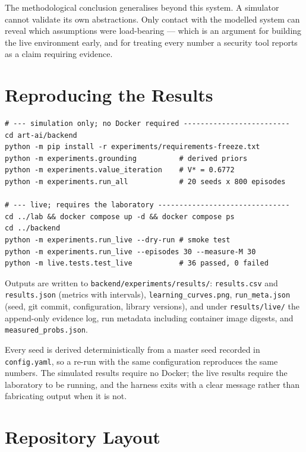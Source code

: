 \documentclass[11pt,a4paper]{report}
\newcommand{\code}[1]{\texttt{\small #1}}
\begin{document}
The methodological conclusion generalises beyond this system. A simulator cannot
validate its own abstractions. Only contact with the modelled system can reveal
which assumptions were load-bearing --- which is an argument for building the
live environment early, and for treating every number a security tool reports as
a claim requiring evidence.

\appendix
\chapter{Reproducing the Results}
\label{app:reproduce}

\begin{lstlisting}[caption={Complete reproduction path.}]
# --- simulation only; no Docker required -------------------------
cd art-ai/backend
python -m pip install -r experiments/requirements-freeze.txt
python -m experiments.grounding          # derived priors
python -m experiments.value_iteration    # V* = 0.6772
python -m experiments.run_all            # 20 seeds x 800 episodes

# --- live; requires the laboratory -------------------------------
cd ../lab && docker compose up -d && docker compose ps
cd ../backend
python -m experiments.run_live --dry-run # smoke test
python -m experiments.run_live --episodes 30 --measure-M 30
python -m live.tests.test_live           # 36 passed, 0 failed
\end{lstlisting}

Outputs are written to \code{backend/experiments/results/}: \code{results.csv}
and \code{results.json} (metrics with intervals), \code{learning\_curves.png},
\code{run\_meta.json} (seed, git commit, configuration, library versions), and
under \code{results/live/} the append-only evidence log, run metadata including
container image digests, and \code{measured\_probs.json}.

Every seed is derived deterministically from a master seed recorded in
\code{config.yaml}, so a re-run with the same configuration reproduces the same
numbers. The simulated results require no Docker; the live results require the
laboratory to be running, and the harness exits with a clear message rather than
fabricating output when it is not.

\chapter{Repository Layout}
\end{document}
